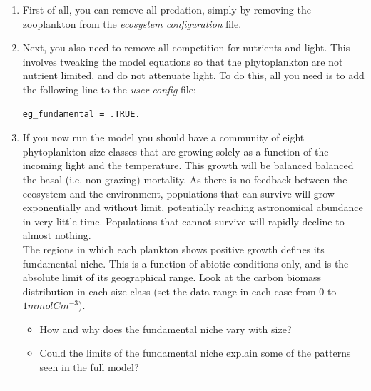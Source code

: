 \begin{enumerate}[noitemsep]
\vspace{1mm}
\item First of all, you can remove all predation, simply by removing the zooplankton from the \textit{ecosystem configuration} file.
\vspace{1mm}
\item Next, you also need to remove all competition for nutrients and light. This involves tweaking the model equations so that the phytoplankton are not nutrient limited, and do not attenuate light. To do this, all you need is to add the following line to the \textit{user-config} file:
\vspace{-1mm}
\small\begin{verbatim}
eg_fundamental = .TRUE.
\end{verbatim}\normalsize
\vspace{-1mm}
\item If you now run the model you should have a community of eight phytoplankton size classes that are growing solely as a function of the incoming light and the temperature. This growth will be balanced balanced the basal (i.e. non-grazing) mortality. As there is no feedback between the ecosystem and the environment, populations that can survive will grow exponentially and without limit, potentially reaching astronomical abundance in very little time. Populations that cannot survive will rapidly decline to almost nothing.
\vspace{1mm}
\\The regions in which each plankton shows positive growth defines its fundamental niche. This is a function of abiotic conditions only, and is the absolute limit of its geographical range. Look at the carbon biomass distribution in each size class (set the data range in each case from \(0\) to \(1mmolCm^{-3}\)).
\vspace{1mm}
\begin{itemize}
\item How and why does the fundamental niche vary with size?
\item Could the limits of the fundamental niche explain some of the patterns seen in the full model?
\end{itemize}

\end{enumerate}
\vspace{2mm}

\vspace{1mm}
\noindent\rule{4cm}{0.1mm}

